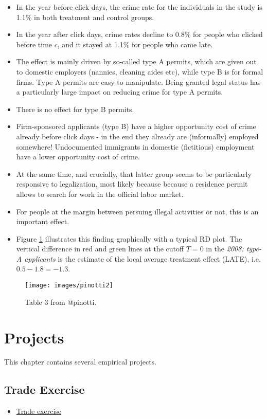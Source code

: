 \documentclass[]{book}
\providecommand{\tightlist}{%
  \setlength{\itemsep}{0pt}\setlength{\parskip}{0pt}}
\begin{document}
\begin{itemize}
\tightlist
\item
  In the year before click days, the crime rate for the individuals in the study is 1.1\% in both treatment and control groups.
\item
  In the year after click days, crime rates decline to 0.8\% for people who clicked before time \(c\), and it stayed at 1.1\% for people who came late.
\item
  The effect is mainly driven by so-called type A permits, which are given out to domestic employers (nannies, cleaning aides etc), while type B is for formal firms. Type A permits are easy to manipulate. Being granted legal status has a particularly large impact on reducing crime for type A permits.
\item
  There is no effect for type B permits.
\item
  Firm-sponsored applicants (type B) have a higher opportunity cost of crime already before click days - in the end they already are (informally) employed somewhere! Undocumented immigrants in domestic (fictitious) employment have a lower opportunity cost of crime.
\item
  At the same time, and crucially, that latter group seems to be particularly responsive to legalization, most likely because because a residence permit allows to search for work in the official labor market.
\item
  For people at the margin between persuing illegal activities or not, this is an important effect.
\item
  Figure \ref{fig:pin2} illustrates this finding graphically with a typical RD plot. The vertical difference in red and green lines at the cutoff \(T=0\) in the \emph{2008: type-A applicants} is the estimate of the local average treatment effect (LATE), i.e. \(0.5 - 1.8 = -1.3\).
\end{itemize}

\begin{figure}

{\centering \texttt{[image: images/pinotti2]} 

}

\caption{Table 3 from @pinotti.}\label{fig:pin2}
\end{figure}

\hypertarget{projects}{%
\chapter{Projects}\label{projects}}

This chapter contains several empirical projects.

\hypertarget{trade-exercise}{%
\section{Trade Exercise}\label{trade-exercise}}

\begin{itemize}
\tightlist
\item
  \href{images/trade.html}{Trade exercise}
\end{itemize}


\end{document}
